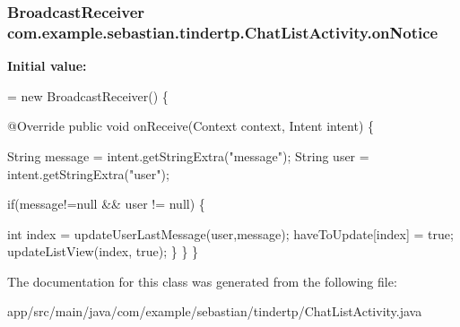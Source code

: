 \subsubsection[{\texorpdfstring{on\+Notice}{onNotice}}]{\setlength{\rightskip}{0pt plus 5cm}Broadcast\+Receiver com.\+example.\+sebastian.\+tindertp.\+Chat\+List\+Activity.\+on\+Notice\hspace{0.3cm}{\ttfamily [private]}}\hypertarget{classcom_1_1example_1_1sebastian_1_1tindertp_1_1ChatListActivity_a3dfd0b937f133bc3ec2efe6861cd20d7}{}\label{classcom_1_1example_1_1sebastian_1_1tindertp_1_1ChatListActivity_a3dfd0b937f133bc3ec2efe6861cd20d7}
{\bfseries Initial value\+:}
\begin{DoxyCode}
= \textcolor{keyword}{new} BroadcastReceiver() \{

        @Override
        \textcolor{keyword}{public} \textcolor{keywordtype}{void} onReceive(Context context, Intent intent) \{

            String message = intent.getStringExtra(\textcolor{stringliteral}{"message"});
            String user = intent.getStringExtra(\textcolor{stringliteral}{"user"});

            \textcolor{keywordflow}{if}(message!=null && user != null) \{

                \textcolor{keywordtype}{int} index = updateUserLastMessage(user,message);
                haveToUpdate[index] = \textcolor{keyword}{true};
                updateListView(index, \textcolor{keyword}{true});
            \}
        \}
    \}
\end{DoxyCode}


The documentation for this class was generated from the following file\+:\begin{DoxyCompactItemize}
\item 
app/src/main/java/com/example/sebastian/tindertp/Chat\+List\+Activity.\+java\end{DoxyCompactItemize}
